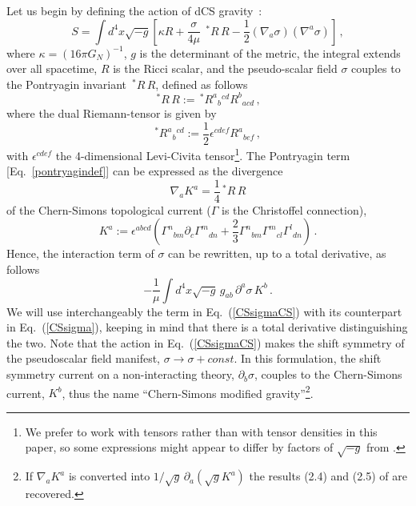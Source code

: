 \documentclass[prd,twocolumn,showpacs,superscriptaddress,nofootinbib]{revtex4-2}
\newcommand\be{\begin{equation}}
\newcommand\ee{\end{equation}}
\newcommand{\pont}{{\,^\ast\!}R\,R}
\begin{document}
Let us begin by defining the action of dCS gravity~\cite{jackiw}:
%
\be
\label{CSsigma}
S =  \int d^4x \sqrt{-g} \left[\kappa R + \frac{\sigma }{4\mu } \; \pont
- \frac{1}{2} \left(\nabla_a \sigma  \right) \left(\nabla^a \sigma \right) \right]\,, 
\ee
%
where $\kappa = (16 \pi G_N)^{-1}$, $g$ is the determinant of the metric, the integral extends over all spacetime, $R$ is the Ricci scalar, and the pseudo-scalar field $\sigma$  couples to the Pontryagin invariant $\pont$,  defined as follows
%
\be
\label{pontryagindef}
\pont:={\,^\ast\!}R^a{}_b{}^{cd} R^b{}_{acd}\,,
\ee
%
where the dual Riemann-tensor is given by
%
\be
\label{Rdual}
{^\ast}R^a{}_b{}^{cd}:=\frac12 \epsilon^{cdef}R^a{}_{bef}\,,
\ee
%
with $\epsilon^{cdef}$ the 4-dimensional Levi-Civita tensor\footnote{We prefer to work with tensors rather than with tensor densities in this paper, so some expressions might appear to differ by factors of $\sqrt{-g}$ from \cite{Jackiw:2003pm}.}. The Pontryagin term [Eq.~\eqref{pontryagindef}] can be expressed as the divergence
%
\be
\nabla_a K^a = \frac14 \pont 
\label{eq:curr1}
\ee
%
of the Chern-Simons topological current ($\Gamma$ is the Christoffel connection), 
%
\be
K^a :=\epsilon^{abcd}\left(\Gamma^n{}_{bm}\partial_c\Gamma^m{}_{dn}+\frac23\Gamma^n{}_{bm}\Gamma^m{}_{cl}\Gamma^l{}_{dn}\right)\,.
\label{eq:curr2}   
\ee
%
Hence, the interaction term of $\sigma$  can be rewritten, up to a total derivative, as follows  
\be
\label{CSsigmaCS}
 - \frac{ 1 }{\mu }  \int d^4x \sqrt{-g} \, g_{ab} \, \partial^a \sigma \, K^b\,. 
\ee
We will use interchangeably the term in Eq.~(\ref {CSsigmaCS})  with  its counterpart  in Eq.~(\ref {CSsigma}),
keeping in mind that there is a total derivative distinguishing the two. Note that the action in Eq.~(\ref {CSsigmaCS})
makes the shift symmetry of the  pseudoscalar field manifest, $\sigma\to\sigma +const$.
In this formulation, the shift symmetry current on a non-interacting theory, $\partial_b \sigma$, couples
to the Chern-Simons current, $K^b$, thus the name ``Chern-Simons modified gravity''\footnote{If $\nabla_a K^a$ is converted into $1/\sqrt{g} \, \partial_a (\sqrt{g} K^a)$ the results (2.4) and (2.5) of \cite{Jackiw:2003pm} are recovered.}. 

\end{document}

